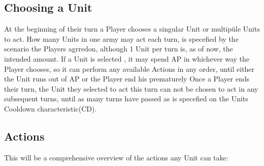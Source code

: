 \documentclass[a4paper,14pt]{book}
\begin{document}
\subsection{Choosing a Unit}
At the beginning of their turn a Player chooses a singular Unit or multipüle Units to act. How many Units in one army may act each turn, is specefied by the scenario the Players agrredon, although 1 Unit per turn is, as of now, the intended amount. If a Unit is selected , it may spend AP in whichever way the Player chooses, so it can perform any available Actions in any order, until either the Unit runs out of AP or the Player end his prematurely Once a Player ends their turn, the Unit they selected to act this turn can not be chosen to act in any subsequent turns, until as many turns have passed as is specefied on the Units Cooldown characteristic(CD).\\

\subsection{Actions}

This will be a comprehensive overview of the actions any Unit can take:
\end{document}
